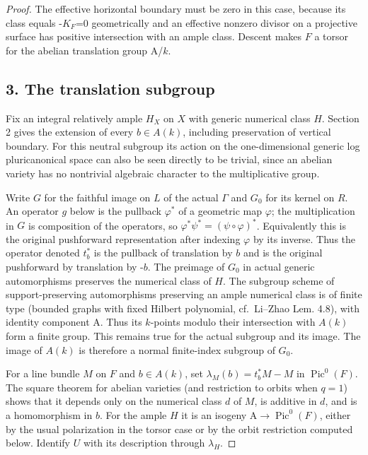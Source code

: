 \documentclass[11pt]{article}
\begin{document}
\begin{proof}
The effective horizontal boundary must be zero in this case, because its class equals -\(K_F\)=0
geometrically and an effective nonzero divisor on a projective surface has positive intersection with an
ample class. Descent makes \(F\) a torsor for the abelian translation group A/\(k\).

\subsection*{3. The translation subgroup}

Fix an integral relatively ample \(H_X\) on \(X\) with generic numerical class \(H\). Section 2 gives the
extension of every \(b\in\)\(A(k)\), including preservation of vertical boundary. For this neutral
subgroup its action on the one-dimensional generic log pluricanonical space can also be seen directly to
be trivial, since an abelian variety has no nontrivial algebraic character to the multiplicative group.

Write \(G\) for the faithful image on \(L\) of the actual \(\Gamma\) and \(G_0\) for its kernel on \(R\).
An operator \(g\) below is the pullback \(\varphi^*\) of a geometric map \(\varphi\); the multiplication
in \(G\) is composition of the operators, so \(\varphi^*\psi^*=(\psi\circ\varphi)^*\). Equivalently this
is the original pushforward representation after indexing \(\varphi\) by its inverse. Thus the operator
denoted \(t_b^*\) is the pullback of translation by \(b\) and is the original pushforward by translation
by -\(b\). The preimage of \(G_0\) in actual generic automorphisms preserves the numerical class of
\(H\). The subgroup scheme of support-preserving automorphisms preserving an ample numerical class is of
finite type (bounded graphs with fixed Hilbert polynomial, cf.~Li--Zhao Lem. 4.8), with identity
component A. Thus its \(k\)-points modulo their intersection with \(A(k)\) form a finite group. This
remains true for the actual subgroup and its image. The image of \(A(k)\) is therefore a normal
finite-index subgroup of \(G_0\).

For a line bundle \(M\) on \(F\) and \(b\in\)\(A(k)\), set \(\lambda_M(b)=t_b^*M-M\) in
\(\operatorname{Pic}^0(F)\). The square theorem for abelian varieties (and restriction to orbits when
\(q=1\)) shows that it depends only on the numerical class \(d\) of \(M\), is additive in \(d\), and is a
homomorphism in \(b\). For the ample \(H\) it is an isogeny A\(\to\operatorname{Pic}^0(F)\), either
by the usual polarization in the torsor case or by the orbit restriction computed below. Identify \(U\)
with its description through \(\lambda_H\).


\end{proof}
\end{document}
